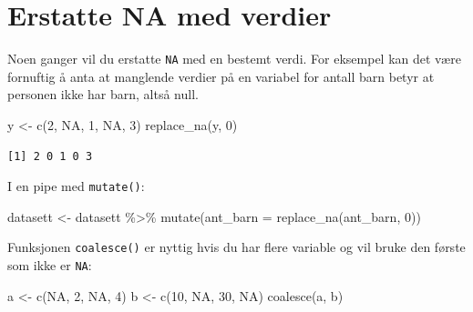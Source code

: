 \documentclass[
  norsk,
  letterpaper,
  DIV=11,
  numbers=noendperiod]{scrreprt}
\newenvironment{Shaded}{\begin{snugshade}}{\end{snugshade}}
\newcommand{\AttributeTok}[1]{\textcolor[rgb]{0.40,0.45,0.13}{#1}}
\newcommand{\ConstantTok}[1]{\textcolor[rgb]{0.56,0.35,0.01}{#1}}
\newcommand{\DecValTok}[1]{\textcolor[rgb]{0.68,0.00,0.00}{#1}}
\newcommand{\FunctionTok}[1]{\textcolor[rgb]{0.28,0.35,0.67}{#1}}
\newcommand{\NormalTok}[1]{\textcolor[rgb]{0.00,0.23,0.31}{#1}}
\newcommand{\OtherTok}[1]{\textcolor[rgb]{0.00,0.23,0.31}{#1}}
\newcommand{\SpecialCharTok}[1]{\textcolor[rgb]{0.37,0.37,0.37}{#1}}
\theoremstyle{definition}
\theoremstyle{remark}
\begin{document}
\section{Erstatte NA med verdier}\label{erstatte-na-med-verdier}

Noen ganger vil du erstatte \texttt{NA} med en bestemt verdi. For
eksempel kan det være fornuftig å anta at manglende verdier på en
variabel for antall barn betyr at personen ikke har barn, altså null.

\begin{Shaded}
\begin{Highlighting}[]
\NormalTok{y }\OtherTok{\textless{}{-}} \FunctionTok{c}\NormalTok{(}\DecValTok{2}\NormalTok{, }\ConstantTok{NA}\NormalTok{, }\DecValTok{1}\NormalTok{, }\ConstantTok{NA}\NormalTok{, }\DecValTok{3}\NormalTok{)}
\FunctionTok{replace\_na}\NormalTok{(y, }\DecValTok{0}\NormalTok{)}
\end{Highlighting}
\end{Shaded}

\begin{verbatim}
[1] 2 0 1 0 3
\end{verbatim}

I en pipe med \texttt{mutate()}:

\begin{Shaded}
\begin{Highlighting}[]
\NormalTok{datasett }\OtherTok{\textless{}{-}}\NormalTok{ datasett }\SpecialCharTok{\%\textgreater{}\%}
  \FunctionTok{mutate}\NormalTok{(}\AttributeTok{ant\_barn =} \FunctionTok{replace\_na}\NormalTok{(ant\_barn, }\DecValTok{0}\NormalTok{))}
\end{Highlighting}
\end{Shaded}

Funksjonen \texttt{coalesce()} er nyttig hvis du har flere variable og
vil bruke den første som ikke er \texttt{NA}:

\begin{Shaded}
\begin{Highlighting}[]
\NormalTok{a }\OtherTok{\textless{}{-}} \FunctionTok{c}\NormalTok{(}\ConstantTok{NA}\NormalTok{, }\DecValTok{2}\NormalTok{, }\ConstantTok{NA}\NormalTok{, }\DecValTok{4}\NormalTok{)}
\NormalTok{b }\OtherTok{\textless{}{-}} \FunctionTok{c}\NormalTok{(}\DecValTok{10}\NormalTok{, }\ConstantTok{NA}\NormalTok{, }\DecValTok{30}\NormalTok{, }\ConstantTok{NA}\NormalTok{)}
\FunctionTok{coalesce}\NormalTok{(a, b)}
\end{Highlighting}
\end{Shaded}
\end{document}
